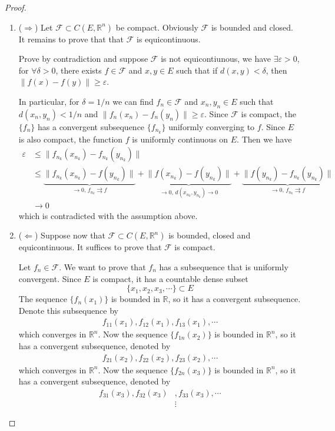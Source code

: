 \documentclass[12pt,leqno]{amsart}
\theoremstyle{definition}
\numberwithin{equation}{subsection}
\begin{document}
\begin{proof}
~\begin{enumerate}
    \item ($\Rightarrow$) Let $\mathcal{F}\subset C(E,\mathbb{R}^n)$ be compact. Obviously $\mathcal{F}$ is bounded and closed. It remains to prove that that $\mathcal{F}$ is equicontinuous. 
    
    Prove by contradiction and suppose $\mathcal{F}$ is not equicontiunous, we have $\exists \varepsilon > 0$, for $\forall \delta > 0$, there exists $f\in\mathcal{F}$ and $x,y\in E$ such that if $d(x,y) < \delta$, then $\|f(x) - f(y)\| \geq \varepsilon$. 
    
    In particular, for $\delta = 1/n$ we can find $f_n\in\mathcal{F}$ and $x_n, y_n\in E$ such that $d(x_n,y_n) < 1/n$ and $\|f_n(x_n) - f_n(y_n)\| \geq \varepsilon$. Since $\mathcal{F}$ is compact, the $\{f_n\}$ has a convergent subsequence $\{f_{n_k}\}$ uniformly converging to $f$. Since $E$ is also compact, the function $f$ is uniformly continuous on $E$. Then we have 
    \begin{align*}
        \varepsilon & \leq \|f_{n_k}\left(x_{n_k}\right) - f_{n_k}\left(y_{n_k}\right)\| \\
        & \leq \underbrace{\|f_{n_k}\left(x_{n_k}\right) - f\left(y_{n_k}\right)\|}_{\longrightarrow 0, \,f_{n_k}\rightrightarrows f} + \underbrace{\|f\left(x_{n_k}\right) - f\left(y_{n_k}\right)\|}_{\longrightarrow 0,\, d(x_{n_k},y_{n_k})\to 0} + \underbrace{\|f\left(y_{n_k}\right) - f_{n_k}\left(y_{n_k}\right)\|}_{\longrightarrow 0, \,f_{n_k}\rightrightarrows f} \\
        & \to 0
    \end{align*}
    which is contradicted with the assumption above.
    \item ($\Leftarrow$) Suppose now that $\mathcal{F}\subset C(E,\mathbb{R}^n)$ is bounded, closed and equicontinuous. It suffices to prove that $\mathcal{F}$ is compact. 
    
    Let $f_n\in\mathcal{F}$. We want to prove that $f_n$ has a subsequence that is uniformly convergent. Since $E$ is compact, it has a countable dense subset 
    $$\{x_1, x_2, x_3,\cdots \}\subset E$$
    The sequence $\{f_n(x_1)\}$ is bounded in $\mathbb{R}$, so it has a convergent subsequence. Denote this subsequence by 
    \begin{align*}
        f_{11}(x_1), f_{12}(x_1), f_{13}(x_1), \cdots 
    \end{align*}
    which converges in $\mathbb{R}^n$. Now the sequence $\{f_{1n}(x_2)\}$ is bounded in $\mathbb{R}^n$, so it has a convergent subsequence, denoted by 
    \begin{align*}
        f_{21}(x_2), f_{22}(x_2), f_{23}(x_2), \cdots 
    \end{align*}
    which converges in $\mathbb{R}^n$. Now the sequence $\{f_{2n}(x_3)\}$ is bounded in $\mathbb{R}^n$, so it has a convergent subsequence, denoted by
    \begin{align*}
        f_{31}(x_3), f_{32}(x_3)& , f_{33}(x_3), \cdots \\
        & \vdots
    \end{align*}
    

\end{enumerate}
\end{proof}
\end{document}
